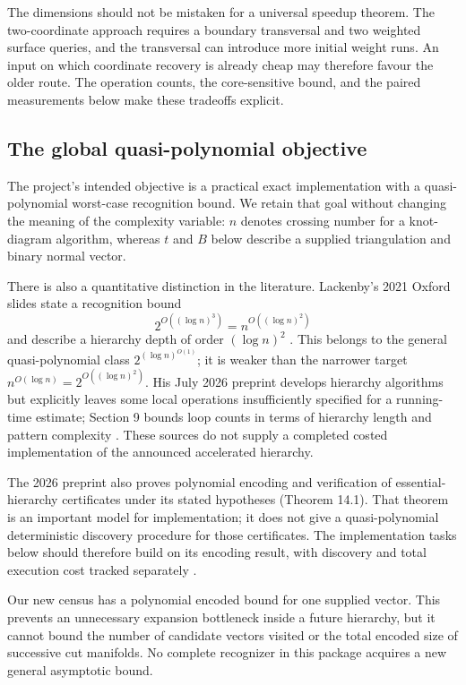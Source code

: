 The dimensions should not be mistaken for a universal speedup theorem.
The two-coordinate approach requires a boundary transversal and two weighted
surface queries, and the transversal can introduce more initial weight runs.
An input on which coordinate recovery is already cheap may therefore favour
the older route. The operation counts, the core-sensitive bound, and the paired
measurements below make these tradeoffs explicit.

\subsection{The global quasi-polynomial objective}

The project's intended objective is a practical exact implementation with a
quasi-polynomial worst-case recognition bound. We retain that goal without
changing the meaning of the complexity variable: $n$ denotes crossing number
for a knot-diagram algorithm, whereas $t$ and $B$ below describe a supplied
triangulation and binary normal vector.

There is also a quantitative distinction in the literature. Lackenby's 2021
Oxford slides state a recognition bound
\[
 2^{O((\log n)^3)}=n^{O((\log n)^2)}
\]
and describe a hierarchy depth of order $(\log n)^2$ \cite{lackenby-talk}.
This belongs to the general quasi-polynomial class
$2^{(\log n)^{O(1)}}$; it is weaker than the narrower target
$n^{O(\log n)}=2^{O((\log n)^2)}$. His July 2026 preprint develops hierarchy
algorithms but explicitly leaves some local operations insufficiently specified
for a running-time estimate; Section 9 bounds loop counts in terms of hierarchy
length and pattern complexity \cite{lackenby2026}. These sources do not supply
a completed costed implementation of the announced accelerated hierarchy.

The 2026 preprint also proves polynomial encoding and verification of
essential-hierarchy certificates under its stated hypotheses (Theorem 14.1).
That theorem is an important model for implementation; it does not give a
quasi-polynomial deterministic discovery procedure for those certificates.
The implementation tasks below should therefore build on its encoding
result, with discovery and total execution cost tracked separately
\cite{lackenby2026}.

Our new census has a polynomial encoded bound for one supplied vector.
This prevents an unnecessary expansion bottleneck inside a future hierarchy,
but it cannot bound the number of candidate vectors visited or the total
encoded size of successive cut manifolds. No complete recognizer in this
package acquires a new general asymptotic bound.

